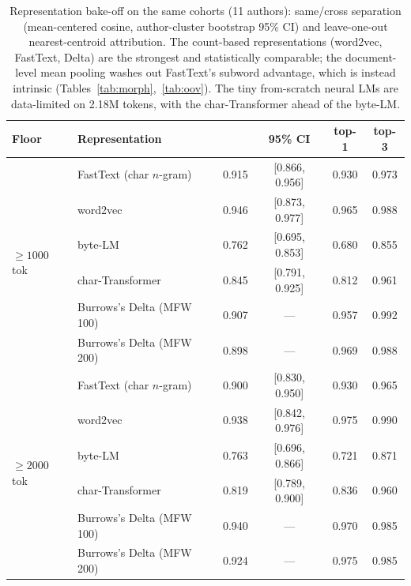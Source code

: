 \begin{table}[t]
  \centering
  \begin{tabular}{llcccc}
    \toprule
    \textbf{Floor} & \textbf{Representation} & \textbf{\auc{}} & \textbf{95\% CI}
    & \textbf{top-1} & \textbf{top-3} \\
    \midrule
    \multirow{6}{*}{$\geq 1000$ tok}
      & FastText (char $n$-gram) & 0.915 & [0.866, 0.956] & 0.930 & 0.973 \\
      & word2vec                 & 0.946 & [0.873, 0.977] & 0.965 & 0.988 \\
      & byte-LM                  & 0.762 & [0.695, 0.853] & 0.680 & 0.855 \\
      & char-Transformer         & 0.845 & [0.791, 0.925] & 0.812 & 0.961 \\
      & Burrows's Delta (MFW 100) & 0.907 & ---           & 0.957 & 0.992 \\
      & Burrows's Delta (MFW 200) & 0.898 & ---           & 0.969 & 0.988 \\
    \midrule
    \multirow{6}{*}{$\geq 2000$ tok}
      & FastText (char $n$-gram) & 0.900 & [0.830, 0.950] & 0.930 & 0.965 \\
      & word2vec                 & 0.938 & [0.842, 0.976] & 0.975 & 0.990 \\
      & byte-LM                  & 0.763 & [0.696, 0.866] & 0.721 & 0.871 \\
      & char-Transformer         & 0.819 & [0.789, 0.900] & 0.836 & 0.960 \\
      & Burrows's Delta (MFW 100) & 0.940 & ---           & 0.970 & 0.985 \\
      & Burrows's Delta (MFW 200) & 0.924 & ---           & 0.975 & 0.985 \\
    \bottomrule
  \end{tabular}
  \caption{Representation bake-off on the same cohorts (11 authors): same/cross
  separation \auc{} (mean-centered cosine, author-cluster bootstrap 95\% CI) and
  leave-one-out nearest-centroid attribution. The count-based representations
  (word2vec, FastText, Delta) are the strongest and statistically comparable;
  the document-level mean pooling washes out FastText's subword advantage, which
  is instead intrinsic (Tables~\ref{tab:morph},~\ref{tab:oov}). The tiny
  from-scratch neural LMs are data-limited on 2.18M tokens, with the
  char-Transformer ahead of the byte-LM.}
  \label{tab:bakeoff}
\end{table}
